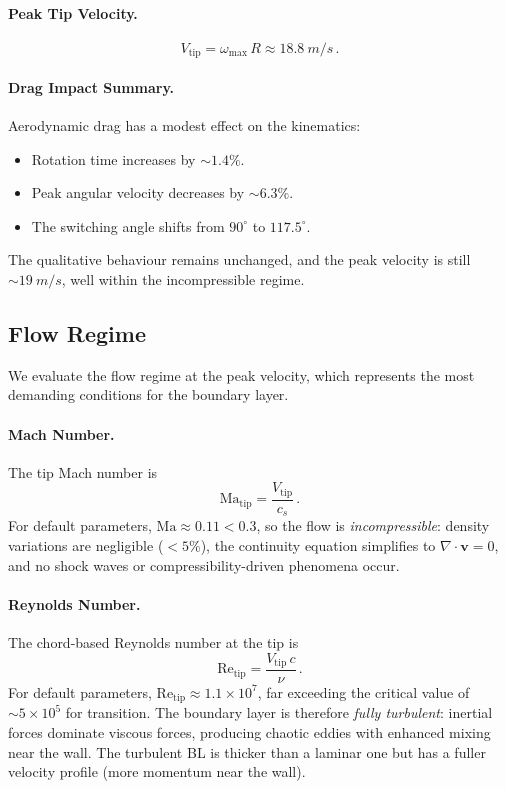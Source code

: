\documentclass[11pt,a4paper]{article}
\begin{document}
\paragraph{Peak Tip Velocity.}
\begin{equation}
  V_\mathrm{tip} = \omega_\mathrm{max}\,R
    \approx \SI{18.8}{m/s}\,.
  \label{eq:Vtip}
\end{equation}

\paragraph{Drag Impact Summary.}
Aerodynamic drag has a modest effect on the kinematics:
\begin{itemize}[nosep]
  \item Rotation time increases by $\sim 1.4\%$.
  \item Peak angular velocity decreases by $\sim 6.3\%$.
  \item The switching angle shifts from $90^\circ$ to $117.5^\circ$.
\end{itemize}
The qualitative behaviour remains unchanged, and the peak velocity is
still $\sim\SI{19}{m/s}$, well within the incompressible regime.

\subsection{Flow Regime}

We evaluate the flow regime at the peak velocity, which represents the
most demanding conditions for the boundary layer.

\paragraph{Mach Number.}
The tip Mach number is
\begin{equation}
  \mathrm{Ma}_\mathrm{tip}
    = \frac{V_\mathrm{tip}}{c_s}\,.
  \label{eq:Mach}
\end{equation}
For default parameters, $\mathrm{Ma} \approx 0.11 < 0.3$, so the flow is
\emph{incompressible}: density variations are negligible ($< 5\%$),
the continuity equation simplifies to $\nabla \cdot \mathbf{v} = 0$,
and no shock waves or compressibility-driven phenomena occur.

\paragraph{Reynolds Number.}
The chord-based Reynolds number at the tip is
\begin{equation}
  \mathrm{Re}_\mathrm{tip} = \frac{V_\mathrm{tip}\,c}{\nu}\,.
  \label{eq:Re}
\end{equation}
For default parameters, $\mathrm{Re}_\mathrm{tip} \approx 1.1 \times 10^7$,
far exceeding the critical value of $\sim 5 \times 10^5$ for transition.
The boundary layer is therefore \emph{fully turbulent}: inertial forces
dominate viscous forces, producing chaotic eddies with enhanced mixing
near the wall. The turbulent BL is thicker than a laminar one but has
a fuller velocity profile (more momentum near the wall).
\end{document}
